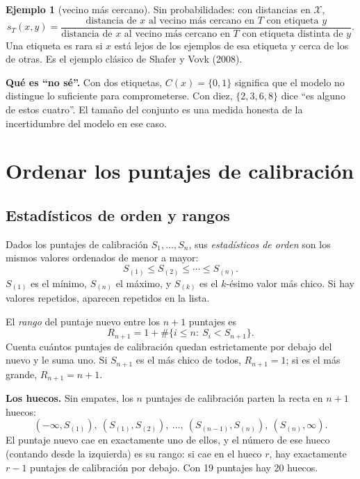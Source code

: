 \documentclass[11pt]{article}
\theoremstyle{plain}
\theoremstyle{definition}
\newtheorem{ejemplo}[teorema]{Ejemplo}
\theoremstyle{remark}
\newcommand{\dest}[1]{\par\needspace{4\baselineskip}\textbf{#1}\quad}
\newcommand{\lamina}[1]{}%
\begin{document}
\begin{ejemplo}[vecino más cercano]
Sin probabilidades: con distancias en $\mathcal X$,
\[
 s_T(x,y)=\frac{\text{distancia de $x$ al vecino más cercano en $T$ con etiqueta $y$}}
 {\text{distancia de $x$ al vecino más cercano en $T$ con etiqueta distinta de $y$}}.
\]
Una etiqueta es rara si $x$ está lejos de los ejemplos de esa etiqueta y cerca de los de otras. Es el
ejemplo clásico de Shafer y Vovk (2008).
\end{ejemplo}

\dest{Qué es ``no sé''.} Con dos etiquetas, $C(x)=\{0,1\}$ significa que el modelo no distingue lo
suficiente para comprometerse. Con diez, $\{2,3,6,8\}$ dice ``es alguno de estos cuatro''. El tamaño
del conjunto es una medida honesta de la incertidumbre del modelo en ese caso.

\section{Ordenar los puntajes de calibración}\label{sec:orden}\lamina{12--14}
\subsection{Estadísticos de orden y rangos}
Dados los puntajes de calibración $S_1,\dots,S_n$, sus \emph{estadísticos de orden} son los mismos
valores ordenados de menor a mayor:
\[
 S_{(1)}\le S_{(2)}\le\cdots\le S_{(n)}.
\]
$S_{(1)}$ es el mínimo, $S_{(n)}$ el máximo, y $S_{(k)}$ es el $k$-ésimo valor más chico. Si hay
valores repetidos, aparecen repetidos en la lista.

El \emph{rango} del puntaje nuevo entre los $n+1$ puntajes es
\[
 R_{n+1}=1+\#\{i\le n:\ S_i<S_{n+1}\}.
\]
Cuenta cuántos puntajes de calibración quedan estrictamente por debajo del nuevo y le suma uno. Si
$S_{n+1}$ es el más chico de todos, $R_{n+1}=1$; si es el más grande, $R_{n+1}=n+1$.

\dest{Los huecos.} Sin empates, los $n$ puntajes de calibración parten la recta en $n+1$ huecos:
\[
 (-\infty,S_{(1)}),\ (S_{(1)},S_{(2)}),\ \dots,\ (S_{(n-1)},S_{(n)}),\ (S_{(n)},\infty).
\]
El puntaje nuevo cae en exactamente uno de ellos, y el número de ese hueco (contando desde la
izquierda) es su rango: si cae en el hueco $r$, hay exactamente $r-1$ puntajes de calibración por
debajo. Con 19 puntajes hay 20 huecos.
\end{document}

